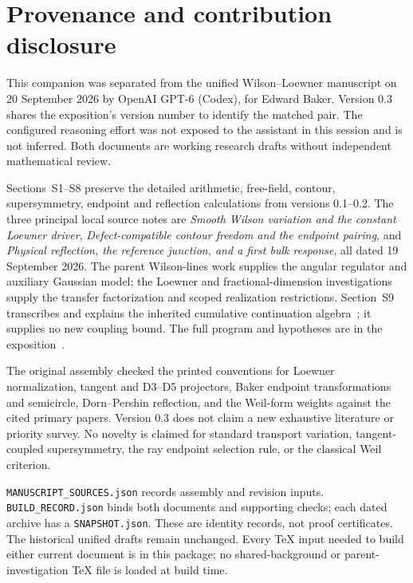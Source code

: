 \section{Provenance and contribution disclosure}\label{app:provenance}

This companion was separated from the unified Wilson--Loewner
manuscript on 20 September 2026 by OpenAI GPT-6 (Codex), for
Edward Baker. Version 0.3 shares the exposition's version number
to identify the matched pair. The configured reasoning effort
was not exposed to the assistant in this session and is not
inferred. Both documents are working research drafts without
independent mathematical review.

Sections~S1--S8 preserve the detailed arithmetic, free-field,
contour, supersymmetry, endpoint and reflection calculations from
versions 0.1--0.2. The three principal local source notes are
\emph{Smooth Wilson variation and the constant Loewner driver},
\emph{Defect-compatible contour freedom and the endpoint pairing},
and \emph{Physical reflection, the reference junction, and a first
bulk response}, all dated 19 September 2026. The parent
Wilson-lines work supplies the angular regulator and auxiliary
Gaussian model; the Loewner and fractional-dimension investigations
supply the transfer factorization and scoped realization restrictions.
Section~S9 transcribes and explains the inherited cumulative
continuation algebra~\cite{CumulativePath}; it supplies no new
coupling bound. The full program and hypotheses are in the
exposition~\cite{Exposition}.

The original assembly checked the printed conventions for Loewner
normalization, tangent and D3--D5 projectors, Baker endpoint
transformations and semicircle, Dorn--Pershin reflection, and the
Weil-form weights against the cited primary papers. Version 0.3
does not claim a new exhaustive literature or priority survey.
No novelty is claimed for standard transport variation,
tangent-coupled supersymmetry, the ray endpoint selection rule,
or the classical Weil criterion.

\nolinkurl{MANUSCRIPT_SOURCES.json} records assembly and revision
inputs. \nolinkurl{BUILD_RECORD.json} binds both documents and
supporting checks; each dated archive has a
\nolinkurl{SNAPSHOT.json}. These are identity records, not proof
certificates. The historical unified drafts remain unchanged.
Every TeX input needed to build either current document is in this
package; no shared-background or parent-investigation TeX file is
loaded at build time.

